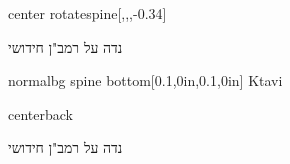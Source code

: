\documentclass[
coverheight=11.25in
coverwidth=8.625in
spinewidth=0.75in
bleedwidth=.125in
marklength=0in,
12pt,
pagecolor=background,
]{bookcover}
\newcommand{\hebtitle}{
נדה על רמב"ן חידושי}
\newcommand{\engtitle}{
}
\newcommand{\hebtext}[1]{
	\begin{hebrew}
		#1
	\end{hebrew}
}
\begin{document}
	\begin{bookcover}
		\begin{bookcoverelement}{center rotate}{spine}[,,,-0.34\coverheight]
			\LARGE\textcolor{text}{\hebtext{\hebtitle} \space \engtitle }
		\end{bookcoverelement}
		\begin{bookcoverelement}{normal}{bg spine bottom}[0.1\spinewidth,0in,0.1\spinewidth,0in]
			\textcolor{text}{Ktavi}
		\end{bookcoverelement}
		
		\begin{bookcoverelement}{center}{back}
			\begin{Huge}
				\textcolor{text}{\hebtext{\hebtitle}}
				
				\textcolor{text}{\engtitle}
				
			\end{Huge}
			\vspace{2\baselineskip}
			\begin{large}
			\end{large}
		\end{bookcoverelement}
	\end{bookcover}
\end{document}
